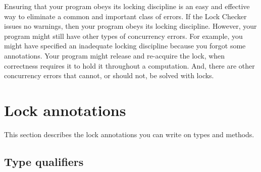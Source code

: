 Ensuring that your program obeys its locking discipline is an easy and
effective way to eliminate a common and important class of errors.
If the Lock Checker issues no warnings, then your program obeys its locking discipline.
However, your program might still have other types of concurrency errors.
%
For example, you might have specified an inadequate locking discipline
because you forgot some 
annotations.
%
Your program might release and
re-acquire the lock, when correctness requires it to hold it throughout a
computation.
%
And, there are other concurrency errors that cannot, or
should not, be solved with locks.


\section{Lock annotations\label{lock-annotations}}

This section describes the lock annotations you can write on types and methods.


\subsection{Type qualifiers\label{lock-type-qualifiers}}

